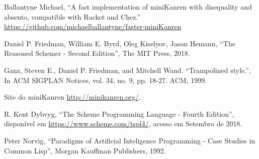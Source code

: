 \documentclass{article}
\begin{document}
    
  \begin{thebibliography}{1}

   Ballantyne Michael,
    ``A fast implementation of miniKanren with disequality and absento, compatible with Racket and Chez.''
    \url{https://github.com/michaelballantyne/faster-miniKanren}

   Daniel P. Friedman, William E. Byrd, Oleg Kiselyov,
    Jason Hemann,
    ``The Reasoned Schemer - Second Edition'',
    The MIT Press, 2018.

   Ganz, Steven E., Daniel P. Friedman, and Mitchell Wand.
    ``Trampolined style.'',
    In ACM SIGPLAN Notices, vol. 34, no. 9, pp. 18-27. ACM, 1999.
    
   Site do miniKanren \url{http://minikanren.org/}.

   R. Kent Dybvyg,
    ``The Scheme Programming Language - Fourth Edition'',
    disponível em \url{https://www.scheme.com/tspl4/}, acesso em
    Setembro de 2018.
    
   Peter Norvig,
    ``Paradigms of Artificial Inteligence Programming - Case Studies
    in Common Lisp'',
    Morgan Kauffman Publishers, 1992.

  \end{thebibliography}
\end{document}
